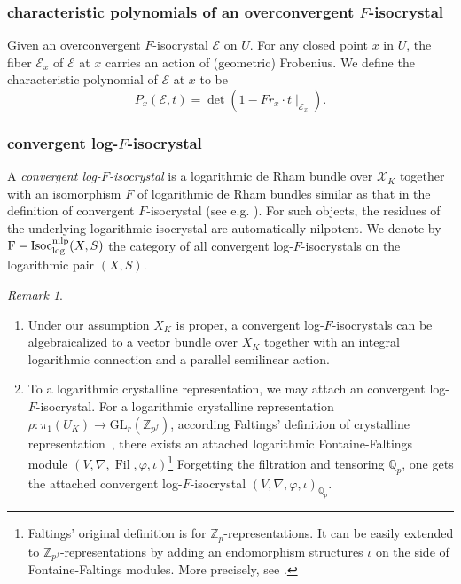 \documentclass[12pt,twoside]{book}
\theoremstyle{plain}
\theoremstyle{definition}
\theoremstyle{remark}
\newtheorem{remark}[remark]{Remark}
\newcommand{\bQ}{{\mathbb Q}}
\newcommand{\mE}{{\mathcal E}}
\newcommand{\mX}{{\mathcal X}}
\DeclareMathOperator\Fil{Fil}
\DeclareMathOperator{\FIsoc}{F-Isoc}
\numberwithin{equation}{section}
\begin{document}
\subsubsection{characteristic polynomials of an overconvergent $F$-isocrystal}
Given an overconvergent $F$-isocrystal $\mE$ on $U$. For any closed point $x$ in $U$, the fiber $\mE_x$ of $\mE$ at $x$ carries an action of (geometric) Frobenius. We define the characteristic polynomial of $\mE$ at $x$ to be
\[P_x(\mE,t)=\det(1-Fr_x\cdot t\mid_{\mE_x}).\]

\subsubsection{convergent log-$F$-isocrystal}
A \emph{convergent log-$F$-isocrystal} is a logarithmic de Rham bundle over $\mX_K$ together with an isomorphism $F$ of logarithmic de Rham bundles similar as that in the definition of convergent $F$-isocrystal (see e.g. \cite[Definition 7.1]{Ked22}). For such objects, the residues of the underlying logarithmic isocrystal are automatically nilpotent. We denote by $\FIsoc^{\rm nilp}_{\log}(X,S)$ the category of all convergent log-$F$-isocrystals on the logarithmic pair $(X,S)$.

\begin{remark}
\begin{enumerate}
\item Under our assumption $X_K$ is proper, a convergent log-$F$-isocrystals can be algebraicalized to a vector bundle over $X_K$ together with an integral logarithmic connection and a parallel semilinear action.
\item To a logarithmic crystalline representation, we may attach an convergent log-$F$-isocrystal. For a logarithmic crystalline representation $\rho\colon \pi_1(U_K)\rightarrow \textrm{GL}_r(\mathbb{Z}_{p^f})$, according Faltings' definition of crystalline representation~\cite{Fal89}, there exists an attached logarithmic Fontaine-Faltings module $(V,\nabla,\Fil,\varphi,\iota)$\footnote{Faltings' original definition is for $\mathbb Z_p$-representations. It can be easily extended to $\mathbb Z_{p^f}$-representations by adding an endomorphism structures $\iota$ on the side of Fontaine-Faltings modules. More precisely, see \cite{LSZ19}.} Forgetting the filtration and tensoring $\mathbb Q_p$, one gets the attached convergent log-$F$-isocrystal $(V,\nabla,\varphi,\iota)_{\bQ_p}$.
\end{enumerate}
\end{remark}
\end{document}
